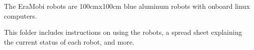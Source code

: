 The EraMobi robots are 100cmx100cm blue aluminum robots with onboard linux computers.  

This folder includes instructions on using the robots, a spread sheet explaining the current status of each robot, and more.